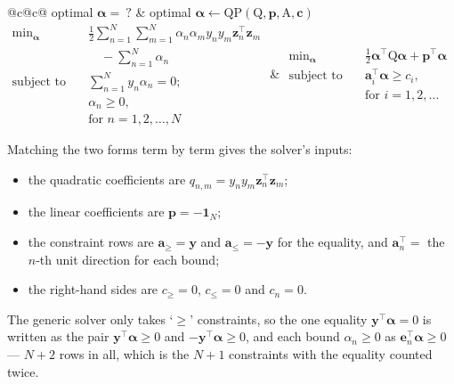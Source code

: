 \begin{center}
    \begin{tabular}{@{}c@{\qquad}c@{}}
        optimal \(\bm{\alpha} = \ ?\) & optimal \(\bm{\alpha} \gets
            \mathrm{QP}(\mathrm{Q}, \bm{p}, \mathrm{A}, \bm{c})\)\\[6pt]
        \(\begin{aligned}
            \min_{\bm{\alpha}} \quad & \tfrac{1}{2} \textstyle\sum_{n=1}^N
                \sum_{m=1}^N \alpha_n \alpha_m y_n y_m \bm{z}_n^\top
                \bm{z}_m\\
            & \quad - \textstyle\sum_{n=1}^N \alpha_n\\
            \text{subject to} \quad & \textstyle\sum_{n=1}^N y_n \alpha_n =
                0;\\
            & \alpha_n \ge 0,\\
            & \text{for } n = 1, 2, \dots , N
        \end{aligned}\)
        &
        \(\begin{aligned}
            \min_{\bm{\alpha}} \quad & \tfrac{1}{2} \bm{\alpha}^\top
                \mathrm{Q} \bm{\alpha} + \bm{p}^\top \bm{\alpha}\\
            \text{subject to} \quad & \bm{a}_i^\top \bm{\alpha} \ge c_i,\\
            & \text{for } i = 1, 2, \dots
        \end{aligned}\)
    \end{tabular}
\end{center}

Matching the two forms term by term gives the solver's inputs:
\begin{itemize}
    \item the quadratic coefficients are \(q_{n,m} = y_n y_m \bm{z}_n^\top
        \bm{z}_m\);
    \item the linear coefficients are \(\bm{p} = -\bm{1}_N\);
    \item the constraint rows are \(\bm{a}_{\ge} = \bm{y}\) and
        \(\bm{a}_{\le} = -\bm{y}\) for the equality, and \(\bm{a}_n^\top =\)
        the \(n\)-th unit direction for each bound;
    \item the right-hand sides are \(c_{\ge} = 0\), \(c_{\le} = 0\) and
        \(c_n = 0\).
\end{itemize}

The generic solver only takes `\(\ge\)' constraints, so the one equality
\(\bm{y}^\top \bm{\alpha} = 0\) is written as the pair \(\bm{y}^\top
\bm{\alpha} \ge 0\) and \(-\bm{y}^\top \bm{\alpha} \ge 0\), and each bound
\(\alpha_n \ge 0\) as \(\bm{e}_n^\top \bm{\alpha} \ge 0\) --- \(N + 2\) rows
in all, which is the \(N + 1\) constraints with the equality counted twice.

